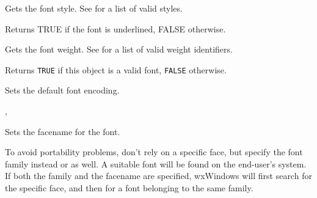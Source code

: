 Gets the font style. See  for a list of valid
styles.



\label{wxfontgetunderlined}


Returns TRUE if the font is underlined, FALSE otherwise.



\label{wxfontgetweight}


Gets the font weight. See  for a list of valid
weight identifiers.



\label{wxfontok}


Returns {\tt TRUE} if this object is a valid font, {\tt FALSE} otherwise.

\label{wxfontsetdefaultencoding}


Sets the default font encoding.


, 

\label{wxfontsetfacename}


Sets the facename for the font.




To avoid portability problems, don't rely on a specific face, but specify the font family
instead or as well. A suitable font will be found on the end-user's system. If both the
family and the facename are specified, wxWindows will first search for the specific face,
and then for a font belonging to the same family.

